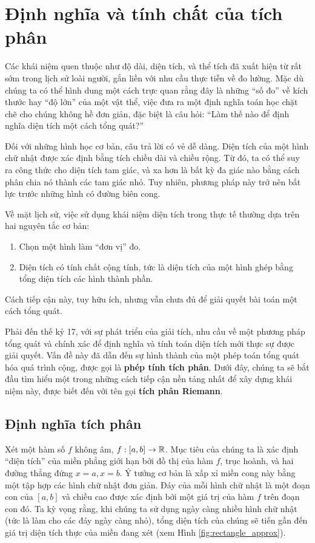 \section{Định nghĩa và tính chất của tích phân}

Các khái niệm quen thuộc như độ dài, diện tích, và thể tích đã xuất hiện từ rất sớm trong lịch sử loài người, gắn liền với nhu cầu thực tiễn về đo lường. Mặc dù chúng ta có thể hình dung một cách trực quan rằng đây là những ``số đo'' về kích thước hay ``độ lớn'' của một vật thể, việc đưa ra một định nghĩa toán học chặt chẽ cho chúng không hề đơn giản, đặc biệt là câu hỏi: ``Làm thế nào để định nghĩa diện tích một cách tổng quát?''

Đối với những hình học cơ bản, câu trả lời có vẻ dễ dàng. Diện tích của một hình chữ nhật được xác định bằng tích chiều dài và chiều rộng. Từ đó, ta có thể suy ra công thức cho diện tích tam giác, và xa hơn là bất kỳ đa giác nào bằng cách phân chia nó thành các tam giác nhỏ. Tuy nhiên, phương pháp này trở nên bất lực trước những hình có đường biên cong.

Về mặt lịch sử, việc sử dụng khái niệm diện tích trong thực tế thường dựa trên hai nguyên tắc cơ bản: 
\begin{enumerate}[label=(\arabic*)]
    \item Chọn một hình làm ``đơn vị'' đo.
    \item Diện tích có tính chất cộng tính, tức là diện tích của một hình ghép bằng tổng diện tích các hình thành phần.
\end{enumerate}
Cách tiếp cận này, tuy hữu ích, nhưng vẫn chưa đủ để giải quyết bài toán một cách tổng quát.

Phải đến thế kỷ 17, với sự phát triển của giải tích, nhu cầu về một phương pháp tổng quát và chính xác để định nghĩa và tính toán diện tích mới thực sự được giải quyết. Vấn đề này đã dẫn đến sự hình thành của một phép toán tổng quát hóa quá trình cộng, được gọi là \textbf{phép tính tích phân}. Dưới đây, chúng ta sẽ bắt đầu tìm hiểu một trong những cách tiếp cận nền tảng nhất để xây dựng khái niệm này, được biết đến với tên gọi \textbf{tích phân Riemann}.

\subsection{Định nghĩa tích phân}

Xét một hàm số $f$ không âm, $f: [a, b] \to \mathbb{R}$. Mục tiêu của chúng ta là xác định ``diện tích'' của miền phẳng giới hạn bởi đồ thị của hàm $f$, trục hoành, và hai đường thẳng đứng $x=a, x=b$. Ý tưởng cơ bản là xấp xỉ miền cong này bằng một tập hợp các hình chữ nhật đơn giản. Đáy của mỗi hình chữ nhật là một đoạn con của $[a,b]$ và chiều cao được xác định bởi một giá trị của hàm $f$ trên đoạn con đó. Ta kỳ vọng rằng, khi chúng ta sử dụng ngày càng nhiều hình chữ nhật (tức là làm cho các đáy ngày càng nhỏ), tổng diện tích của chúng sẽ tiến gần đến giá trị diện tích thực của miền đang xét (xem Hình \ref{fig:rectangle_approx}).

